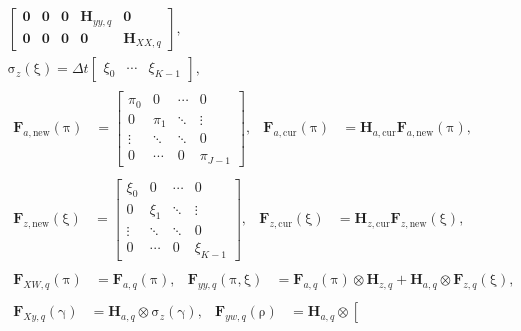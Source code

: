 \documentclass[USenglish]{article}
\renewcommand{\vec}[1]{\boldsymbol{\mathrm{#1}}}
\newcommand{\mat}[1]{\mathbf{#1}}
\begin{document}
\begin{subequations}
\begin{gather}
\begin{bmatrix}
      \mat{0} & \mat{0} & \mat{0} & \mat{H}_{yy, q} & \mat{0}
      \\
      \mat{0} & \mat{0} & \mat{0} & \mat{0} & \mat{H}_{XX, q}
    \end{bmatrix},
    \\
    \vec{\sigma}_z(\vec{\xi}) =
    \Delta t
    \begin{bmatrix}
      \xi_0 & \cdots & \xi_{K - 1}
    \end{bmatrix},
    \\
    \begin{aligned}
      \mat{F}_{a, \mathrm{new}}(\vec{\pi}) &=
      \begin{bmatrix}
        \pi_0 & 0 & \cdots & 0 \\
        0 & \pi_1 & \ddots & \vdots \\
        \vdots & \ddots & \ddots & 0 \\
        0 & \cdots & 0 & \pi_{J - 1}
      \end{bmatrix},
      &
      \mat{F}_{a, \mathrm{cur}}(\vec{\pi}) &=
      \mat{H}_{a, \mathrm{cur}} \mat{F}_{a, \mathrm{new}}(\vec{\pi}),
    \end{aligned}
    \\
    \begin{aligned}
      \mat{F}_{z, \mathrm{new}}(\vec{\xi}) &=
      \begin{bmatrix}
        \xi_0 & 0 & \cdots & 0 \\
        0 & \xi_1 & \ddots & \vdots \\
        \vdots & \ddots & \ddots & 0 \\
        0 & \cdots & 0 & \xi_{K - 1}
      \end{bmatrix},
      &
      \mat{F}_{z, \mathrm{cur}}(\vec{\xi}) &=
      \mat{H}_{z, \mathrm{cur}} \mat{F}_{z, \mathrm{new}}(\vec{\xi}),
    \end{aligned}
    \\
    \begin{aligned}
      \mat{F}_{XW, q}(\vec{\pi}) &=
      \mat{F}_{a, q}(\vec{\pi}),
      &
      \mat{F}_{yy, q}(\vec{\pi}, \vec{\xi}) &=
      \mat{F}_{a, q} (\vec{\pi}) \otimes \mat{H}_{z, q}
      + \mat{H}_{a, q} \otimes \mat{F}_{z, q}(\vec{\xi}),
    \end{aligned}
    \\
    \begin{aligned}
      \mat{F}_{Xy, q}(\vec{\gamma}) &=
      \mat{H}_{a, q} \otimes \vec{\sigma}_z(\vec{\gamma}),
      &
      \mat{F}_{yw, q}(\vec{\rho}) &=
      \mat{H}_{a, q} \otimes \left[

\end{aligned}
\end{gather}
\end{subequations}
\end{document}
